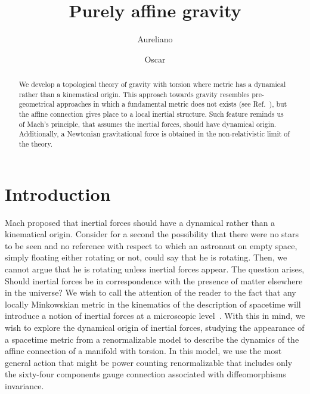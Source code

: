 \documentclass[twocolumn,aps,
  showpacs,showkeys,prd,superscriptaddress]{revtex4-1}
\begin{document}
\title{Purely affine gravity}


\author{Aureliano }

\author{Oscar }

\begin{abstract}
  We develop a topological theory of gravity with torsion where metric has a dynamical rather than a kinematical origin. This approach towards gravity resembles pre-geometrical approaches in which a fundamental metric does not exists (see Ref.~\cite{WheelerPre}), but the  affine connection gives place to a local inertial structure. Such feature reminds us of Mach's principle, that assumes the inertial forces, should have dynamical origin. Additionally, a Newtonian gravitational force is obtained in the non-relativistic limit of the theory.
\end{abstract}


\maketitle

\section{Introduction}


Mach proposed that inertial forces should have a dynamical rather than a kinematical origin. Consider for a second the possibility that there were no stars to be seen and no reference with respect to which an astronaut on empty space, simply floating either rotating or not, could say that he is rotating. Then, we cannot argue that he is rotating unless inertial forces appear.  The question arises, Should inertial forces  be in correspondence with the presence of matter elsewhere in the universe?  We wish to call the attention of the reader to the fact that any locally Minkowskian metric in the kinematics of the description of spacetime will introduce a notion of inertial forces at a microscopic level~\cite{Sciama:1964wt}. With this in mind, we wish to explore the dynamical origin of inertial forces, studying the appearance of a spacetime metric from a renormalizable model to describe the dynamics of the affine connection of a manifold with torsion. In this model, we use the most general action that might be power counting renormalizable that includes only the sixty-four components gauge connection associated with diffeomorphisms invariance.
\end{document}
